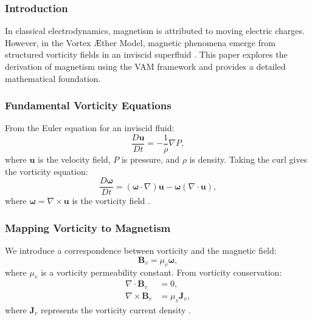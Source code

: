     \subsubsection{Introduction}
    In classical electrodynamics, magnetism is attributed to moving electric charges. However, in the Vortex \AE ther Model, magnetic phenomena emerge from structured vorticity fields in an inviscid superfluid \cite{superfluid_he_interferometers}. This paper explores the derivation of magnetism using the VAM framework and provides a detailed mathematical foundation.

    \subsubsection{Fundamental Vorticity Equations}
    From the Euler equation for an inviscid fluid:
    \begin{equation}
        \frac{D\boldsymbol{u}}{Dt} = -\frac{1}{\rho} \nabla P,
    \end{equation}
    where $\boldsymbol{u}$ is the velocity field, $P$ is pressure, and $\rho$ is density. Taking the curl gives the vorticity equation:
    \begin{equation}
        \frac{D\boldsymbol{\omega}}{Dt} = (\boldsymbol{\omega} \cdot \nabla) \boldsymbol{u} - \boldsymbol{\omega} (\nabla \cdot \boldsymbol{u}),
    \end{equation}
    where $\boldsymbol{\omega} = \nabla \times \boldsymbol{u}$ is the vorticity field \cite{vortex_dynamics_superfluid}.

    \subsubsection{Mapping Vorticity to Magnetism}
    We introduce a correspondence between vorticity and the magnetic field:
    \begin{equation}
        \boldsymbol{B}_v = \mu_v \boldsymbol{\omega},
    \end{equation}
    where $\mu_v$ is a vorticity permeability constant. From vorticity conservation:
    \begin{align}
        \nabla \cdot \boldsymbol{B}_v &= 0, \\
        \nabla \times \boldsymbol{B}_v &= \mu_v \boldsymbol{J}_v,
    \end{align}
    where $\boldsymbol{J}_v$ represents the vorticity current density \cite{higgs_waves_vortex}.

